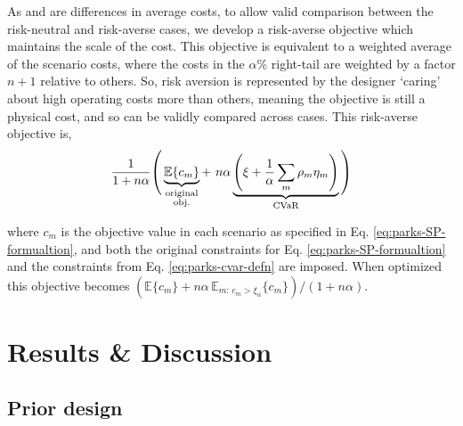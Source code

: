 As  and  are differences in average costs, to allow valid comparison between the risk-neutral and risk-averse cases, we develop a risk-averse objective which maintains the scale of the cost.
This objective is equivalent to a weighted average of the scenario costs, where the costs in the $\alpha\%$ right-tail are weighted by a factor $n{+}1$ relative to others. So, risk aversion is represented by the designer `caring' about high operating costs more than others, meaning the objective is still a physical cost, and so can be validly compared across cases.
This risk-averse objective is,
\begin{equation} \label{eq:parks-risk-averse-obj}
    \frac{1}{1+n\alpha} \vast( \underbrace{\mathbb{E}\lbrace c_{m} \rbrace}_{\substack{\text{original}\\\text{obj.}}} + \ n\alpha \underbrace{\left(\xi + \frac{1}{\alpha} \sum\limits_{m} \rho_{m}\eta_{m} \right)}_{\text{CVaR}} \vast)
\end{equation}

where $c_m$ is the objective value in each scenario as specified in Eq. \ref{eq:parks-SP-formualtion}, and both the original constraints for Eq. \ref{eq:parks-SP-formualtion} and the constraints from Eq. \ref{eq:parks-cvar-defn} are imposed.
When optimized this objective becomes $\left(\mathbb{E}\lbrace c_{m} \rbrace + n\alpha\, \mathbb{E}_{m:\, c_{m}>\xi_\alpha} \lbrace c_{m} \rbrace\right)/(1+n\alpha)$.\\



\section{Results \& Discussion} \label{sec:parks-results}


\subsection{Prior design} \label{sec:parks-prior-design}


